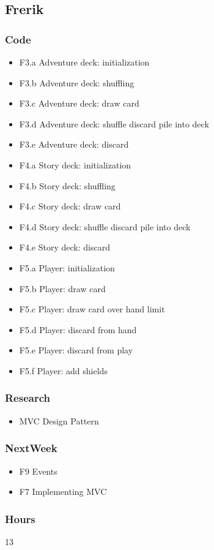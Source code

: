 \documentclass[10pt,a4paper]{article}
\begin{document}
\subsection*{Frerik}

\subsubsection*{Code}
\begin{itemize}
\item F3.a Adventure deck: initialization
\item F3.b Adventure deck: shuffling
\item F3.c Adventure deck: draw card
\item F3.d Adventure deck: shuffle discard pile into deck
\item F3.e Adventure deck: discard
\item F4.a Story deck: initialization
\item F4.b Story deck: shuffling
\item F4.c Story deck: draw card
\item F4.d Story deck: shuffle discard pile into deck
\item F4.e Story deck: discard
\item F5.a Player: initialization
\item F5.b Player: draw card
\item F5.c Player: draw card over hand limit
\item F5.d Player: discard from hand
\item F5.e Player: discard from play
\item F5.f Player: add shields
\end{itemize}
\subsubsection*{Research}
\begin{itemize}
\item MVC Design Pattern
\end{itemize}
\subsubsection*{NextWeek}
\begin{itemize}
\item F9 Events
\item F7 Implementing MVC
\end{itemize}
\subsubsection*{Hours}
13
\end{document}
